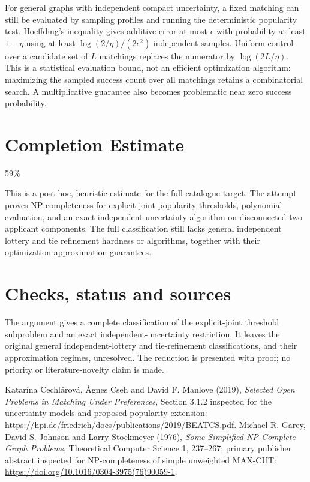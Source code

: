 \documentclass[11pt]{article}
\begin{document}
For general graphs with independent compact uncertainty, a fixed matching can still be evaluated by sampling profiles and running the deterministic popularity test. Hoeffding's inequality gives additive error at most $\epsilon$ with probability at least $1-\eta$ using at least $\log(2/\eta)/(2\epsilon^2)$ independent samples. Uniform control over a candidate set of $L$ matchings replaces the numerator by $\log(2L/\eta)$. This is a statistical evaluation bound, not an efficient optimization algorithm: maximizing the sampled success count over all matchings retains a combinatorial search. A multiplicative guarantee also becomes problematic near zero success probability.

\section{Completion Estimate}
59\%

This is a post hoc, heuristic estimate for the full catalogue target.
The attempt proves NP completeness for explicit joint popularity thresholds, polynomial evaluation, and an exact independent uncertainty algorithm on disconnected two applicant components. The full classification still lacks general independent lottery and tie refinement hardness or algorithms, together with their optimization approximation guarantees.

\section{Checks, status and sources}
The argument gives a complete classification of the explicit-joint threshold subproblem and an exact independent-uncertainty restriction. It leaves the original general independent-lottery and tie-refinement classifications, and their approximation regimes, unresolved. The reduction is presented with proof; no priority or literature-novelty claim is made.

Katar\'ina Cechl\'arov\'a, \'Agnes Cseh and David F. Manlove (2019), \emph{Selected Open Problems in Matching Under Preferences}, Section 3.1.2 inspected for the uncertainty models and proposed popularity extension:
\url{https://hpi.de/friedrich/docs/publications/2019/BEATCS.pdf}.
Michael R. Garey, David S. Johnson and Larry Stockmeyer (1976), \emph{Some Simplified NP-Complete Graph Problems}, Theoretical Computer Science 1, 237--267; primary publisher abstract inspected for NP-completeness of simple unweighted MAX-CUT:
\url{https://doi.org/10.1016/0304-3975(76)90059-1}.
\end{document}
